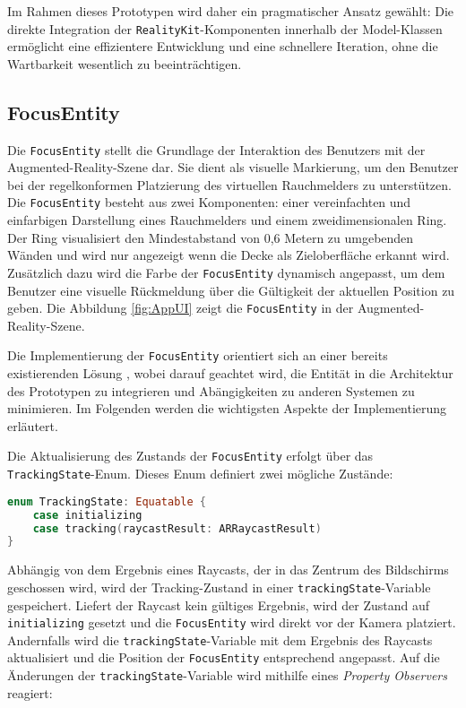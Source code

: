 Im Rahmen dieses Prototypen wird daher ein pragmatischer Ansatz gewählt: Die direkte Integration der \texttt{RealityKit}-Komponenten innerhalb der Model-Klassen ermöglicht eine effizientere Entwicklung und eine schnellere Iteration, ohne die Wartbarkeit wesentlich zu beeinträchtigen.

\subsection{FocusEntity}

Die \texttt{FocusEntity} stellt die Grundlage der Interaktion des Benutzers mit der Augmented-Reality-Szene dar. Sie dient als visuelle Markierung, um den Benutzer bei der regelkonformen Platzierung des virtuellen Rauchmelders zu unterstützen. Die \texttt{FocusEntity} besteht aus zwei Komponenten: einer vereinfachten und einfarbigen Darstellung eines Rauchmelders und einem zweidimensionalen Ring. Der Ring visualisiert den Mindestabstand von 0,6 Metern zu umgebenden Wänden und wird nur angezeigt wenn die Decke als Zieloberfläche erkannt wird. Zusätzlich dazu wird die Farbe der \texttt{FocusEntity} dynamisch angepasst, um dem Benutzer eine visuelle Rückmeldung über die Gültigkeit der aktuellen Position zu geben. Die Abbildung \ref{fig:AppUI} zeigt die \texttt{FocusEntity} in der Augmented-Reality-Szene.

Die Implementierung der \texttt{FocusEntity} orientiert sich an einer bereits existierenden Lösung \cite{cobb2019focusEntity}, wobei darauf geachtet wird, die Entität in die Architektur des Prototypen zu integrieren und Abängigkeiten zu anderen Systemen zu minimieren. Im Folgenden werden die wichtigsten Aspekte der Implementierung erläutert.

Die Aktualisierung des Zustands der \texttt{FocusEntity} erfolgt über das \texttt{TrackingState}-Enum. Dieses Enum definiert zwei mögliche Zustände:

\begin{lstlisting}[language=Swift]
enum TrackingState: Equatable {
    case initializing
    case tracking(raycastResult: ARRaycastResult)
}
\end{lstlisting}

Abhängig von dem Ergebnis eines Raycasts, der in das Zentrum des Bildschirms geschossen wird, wird der Tracking-Zustand in einer \texttt{trackingState}-Variable gespeichert. Liefert der Raycast kein gültiges Ergebnis, wird der Zustand auf \texttt{initializing} gesetzt und die \texttt{FocusEntity} wird direkt vor der Kamera platziert. Andernfalls wird die \texttt{trackingState}-Variable mit dem Ergebnis des Raycasts aktualisiert und die Position der \texttt{FocusEntity} entsprechend angepasst. Auf die Änderungen der \texttt{trackingState}-Variable wird mithilfe eines \textit{Property Observers} reagiert: 

